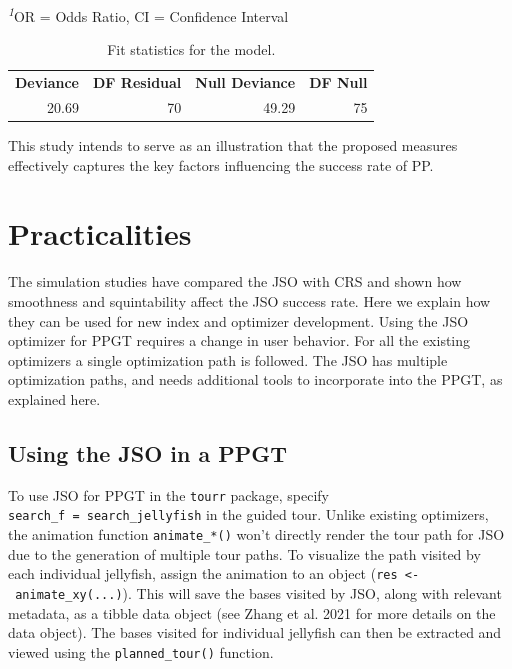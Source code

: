\documentclass[
  12pt,
]{interact}
\theoremstyle{plain}
\begin{document}
\begin{minipage}{\linewidth}
\textsuperscript{\textit{1}}OR = Odds Ratio, CI = Confidence Interval\\
\end{minipage}

\begingroup\fontsize{10}{12}\selectfont

\begin{longtable}[t]{rrrr}

\caption{\label{tbl-joint-output}Fit statistics for the model.}

\tabularnewline

\\
\toprule
\textbf{Deviance} & \textbf{DF Residual} & \textbf{Null Deviance} & \textbf{DF Null}\\
\midrule
20.69 & 70 & 49.29 & 75\\
\bottomrule

\end{longtable}

\endgroup{}

This study intends to serve as an illustration that the proposed
measures effectively captures the key factors influencing the success
rate of PP.

\section{Practicalities}\label{sec-discussion}

The simulation studies have compared the JSO with CRS and shown how
smoothness and squintability affect the JSO success rate. Here we
explain how they can be used for new index and optimizer development.
Using the JSO optimizer for PPGT requires a change in user behavior. For
all the existing optimizers a single optimization path is followed. The
JSO has multiple optimization paths, and needs additional tools to
incorporate into the PPGT, as explained here.

\subsection{Using the JSO in a PPGT}\label{using-the-jso-in-a-ppgt}

To use JSO for PPGT in the \texttt{tourr} package, specify
\texttt{search\_f\ =\ search\_jellyfish} in the guided tour. Unlike
existing optimizers, the animation function \texttt{animate\_*()} won't
directly render the tour path for JSO due to the generation of multiple
tour paths. To visualize the path visited by each individual jellyfish,
assign the animation to an object
(\texttt{res\ \textless{}-\ animate\_xy(...)}). This will save the bases
visited by JSO, along with relevant metadata, as a tibble data object
(see Zhang et al. 2021 for more details on the data object). The bases
visited for individual jellyfish can then be extracted and viewed using
the \texttt{planned\_tour()} function.
\end{document}
